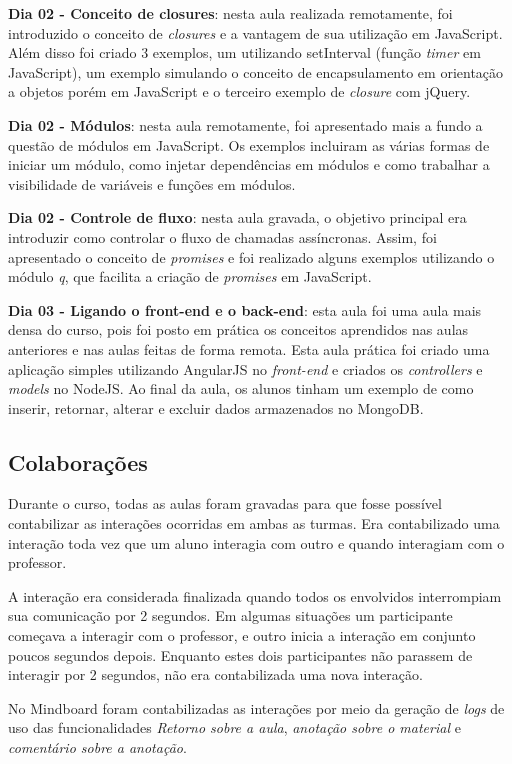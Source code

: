 \textbf{Dia 02 - Conceito de closures}: nesta aula realizada remotamente, foi introduzido o conceito de \emph{closures} e a vantagem de sua utilização em JavaScript. Além disso foi criado 3 exemplos, um utilizando setInterval (função \emph{timer} em JavaScript), um exemplo simulando o conceito de encapsulamento em orientação a objetos porém em JavaScript e o terceiro exemplo de \emph{closure} com jQuery.

\textbf{Dia 02 - Módulos}: nesta aula remotamente, foi apresentado mais a fundo a questão de módulos em JavaScript. Os exemplos incluiram as várias formas de iniciar um módulo, como injetar dependências em módulos e como trabalhar a visibilidade de variáveis e funções em módulos.

\textbf{Dia 02 - Controle de fluxo}: nesta aula gravada, o objetivo principal era introduzir como controlar o fluxo de chamadas assíncronas. Assim, foi apresentado o conceito de \emph{promises} e foi realizado alguns exemplos utilizando o módulo \emph{q}, que facilita a criação de \emph{promises} em JavaScript.

\textbf{Dia 03 - Ligando o front-end e o back-end}: esta aula foi uma aula mais densa do curso, pois foi posto em prática os conceitos aprendidos nas aulas anteriores e nas aulas feitas de forma remota. Esta aula prática foi criado uma aplicação simples utilizando AngularJS no \emph{front-end} e criados os \emph{controllers} e \emph{models} no NodeJS. Ao final da aula, os alunos tinham um exemplo de como inserir, retornar, alterar e excluir dados armazenados no MongoDB.

\subsection{Colaborações}

Durante o curso, todas as aulas foram gravadas para que fosse possível contabilizar as interações ocorridas em ambas as turmas. Era contabilizado uma interação toda vez que um aluno interagia com outro e quando interagiam com o professor.

A interação era considerada finalizada quando todos os envolvidos interrompiam sua comunicação por 2 segundos. Em algumas situações um participante começava a interagir com o professor, e outro inicia a interação em conjunto poucos segundos depois. Enquanto estes dois participantes não parassem de interagir por 2 segundos, não era contabilizada uma nova interação.

No Mindboard foram contabilizadas as interações por meio da geração de \emph{logs} de uso das funcionalidades \emph{Retorno sobre a aula}, \emph{anotação sobre o material} e \emph{comentário sobre a anotação}.

